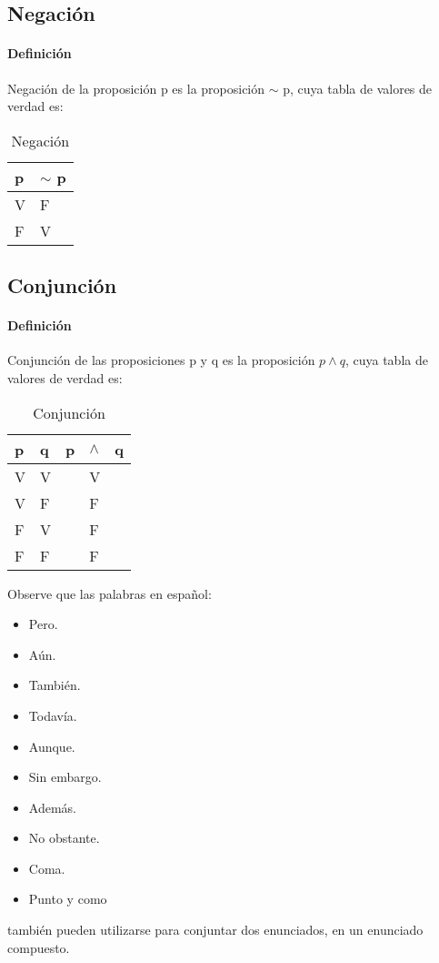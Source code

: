 \documentclass[10pt]{book} 						%
\begin{document}
\subsection{Negación}
\paragraph{Definición}
Negación de la proposición p es la proposición $\sim$ p, cuya tabla de valores de verdad es:
\begin{table}[htbp]
  \centering
  \caption{Negación}
    \begin{tabular}{l|l}
   p &  $\sim$ p   \\
    \midrule
    V     & F      \\
    F     & V     \\

    \end{tabular}%
  \label{tab:addlabel}%
\end{table}%
\subsection{Conjunción}
\paragraph{Definición}
Conjunción de las proposiciones p y q es la proposición $p \land q$, cuya tabla de valores de verdad es:
\begin{table}[htbp]
  \centering
  \caption{Conjunción}
    \begin{tabular}{l|l|rlr}
    p     & q     & \multicolumn{1}{l}{p} & $\land$     & \multicolumn{1}{l}{q} \\
    \midrule
    V     & V     &       & V     &  \\
    V     & F     &       & F     &  \\
    F     & V     &       & F     &  \\
    F     & F     &       & F     &  \\
    \end{tabular}%
  \label{tab:addlabel}%
\end{table}%

Observe que las palabras en español:
\begin{itemize}
\item Pero.
\item Aún.
\item También.
\item Todavía.
\item Aunque.
\item Sin embargo.
\item Además.
\item No obstante.
\item Coma.
\item Punto y como
\end{itemize} 
 también pueden utilizarse para conjuntar dos enunciados, en un enunciado compuesto.
\end{document}
